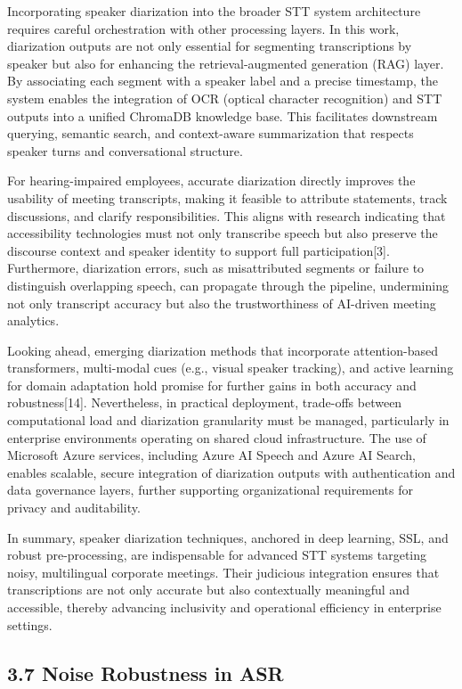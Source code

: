 \documentclass[12pt,a4paper]{article}
\begin{document}
Incorporating speaker diarization into the broader STT system architecture requires careful orchestration with other processing layers. In this work, diarization outputs are not only essential for segmenting transcriptions by speaker but also for enhancing the retrieval-augmented generation (RAG) layer. By associating each segment with a speaker label and a precise timestamp, the system enables the integration of OCR (optical character recognition) and STT outputs into a unified ChromaDB knowledge base. This facilitates downstream querying, semantic search, and context-aware summarization that respects speaker turns and conversational structure.


For hearing-impaired employees, accurate diarization directly improves the usability of meeting transcripts, making it feasible to attribute statements, track discussions, and clarify responsibilities. This aligns with research indicating that accessibility technologies must not only transcribe speech but also preserve the discourse context and speaker identity to support full participation[3]. Furthermore, diarization errors, such as misattributed segments or failure to distinguish overlapping speech, can propagate through the pipeline, undermining not only transcript accuracy but also the trustworthiness of AI-driven meeting analytics.


Looking ahead, emerging diarization methods that incorporate attention-based transformers, multi-modal cues (e.g., visual speaker tracking), and active learning for domain adaptation hold promise for further gains in both accuracy and robustness[14]. Nevertheless, in practical deployment, trade-offs between computational load and diarization granularity must be managed, particularly in enterprise environments operating on shared cloud infrastructure. The use of Microsoft Azure services, including Azure AI Speech and Azure AI Search, enables scalable, secure integration of diarization outputs with authentication and data governance layers, further supporting organizational requirements for privacy and auditability.


In summary, speaker diarization techniques, anchored in deep learning, SSL, and robust pre-processing, are indispensable for advanced STT systems targeting noisy, multilingual corporate meetings. Their judicious integration ensures that transcriptions are not only accurate but also contextually meaningful and accessible, thereby advancing inclusivity and operational efficiency in enterprise settings.


\subsection{3.7 Noise Robustness in ASR}
\end{document}
